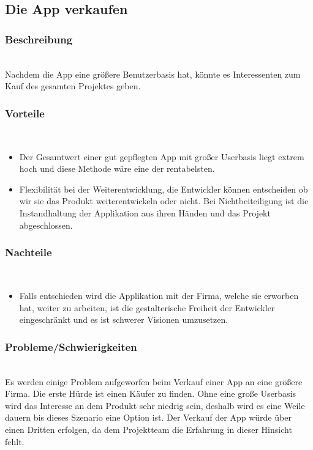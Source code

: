 \documentclass[FIPLY_base.tex]{subfiles}
\begin{document}
\subsection{Die App verkaufen}


\subsubsection{Beschreibung}\ \\
Nachdem die App eine größere Benutzerbasis hat, könnte es Interessenten zum Kauf des gesamten Projektes geben.


\subsubsection{Vorteile}\ \\
\begin{itemize}
\item Der Gesamtwert einer gut gepflegten App mit großer Userbasis liegt extrem hoch und diese Methode wäre eine der rentabelsten.
\item Flexibilität bei der Weiterentwicklung, die Entwickler können entscheiden ob wir sie das Produkt weiterentwickeln oder nicht. Bei Nichtbeiteiligung ist die Instandhaltung der Applikation aus ihren Händen und das Projekt abgeschlossen.
\end{itemize}

\subsubsection{Nachteile}\ \\
\begin{itemize}
\item Falls entschieden wird die Applikation mit der Firma, welche sie erworben hat, weiter zu arbeiten, ist die gestalterische Freiheit der Entwickler eingeschränkt und es ist schwerer Visionen umzusetzen.
\end{itemize}


\subsubsection{Probleme/Schwierigkeiten}\ \\
Es werden einige Problem aufgeworfen beim Verkauf einer App an eine größere Firma. Die erste Hürde ist einen Käufer zu finden.
Ohne eine große Userbasis wird das Interesse an dem Produkt sehr niedrig sein, deshalb wird es eine Weile dauern bis dieses Szenario eine Option ist.
Der Verkauf der App würde über einen Dritten erfolgen, da dem Projektteam die Erfahrung in dieser Hinsicht fehlt.
\end{document}
